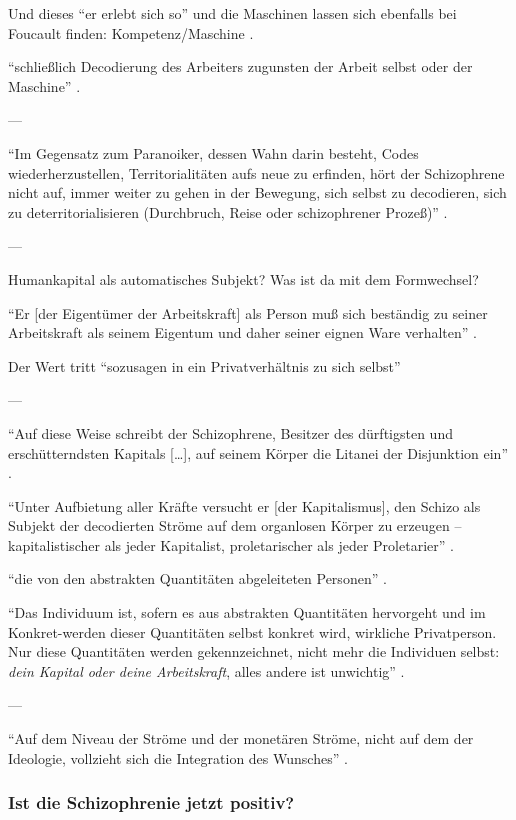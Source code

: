 \documentclass[12pt,
               DIV13,
               paper=a4,
               twoside=false,
               onehalfspacing,
               bibliography=totoc,
               toc=graduated,
               draft,
               ]{scrartcl}
\newcommand{\lips}{\dots\unkern}
\newcommand{\pc}[2]{\parencite[#1]{#2}}
\begin{document}
Und dieses "`er erlebt sich so"' und die Maschinen lassen sich
ebenfalls bei Foucault finden: Kompetenz/Maschine \pc{312+314}{gbp}.

"`schließlich Decodierung des Arbeiters zugunsten der Arbeit selbst
oder der Maschine"' \pc{289}{ao}.

---

"`Im Gegensatz zum Paranoiker, dessen Wahn darin besteht, Codes
wiederherzustellen, Territorialitäten aufs neue zu erfinden, hört der
Schizophrene nicht auf, immer weiter zu gehen in der Bewegung, sich
selbst zu decodieren, sich zu deterritorialisieren (Durchbruch, Reise
oder schizophrener Prozeß)"' \pc{28}{schizg}.

---

Humankapital als automatisches Subjekt? Was ist da mit dem
Formwechsel?

"`Er [der Eigentümer der Arbeitskraft] als Person muß sich beständig
zu seiner Arbeitskraft als seinem Eigentum und daher seiner eignen
Ware verhalten"' \pc{182}{kap}.

Der Wert tritt "`sozusagen in ein Privatverhältnis zu sich selbst"'
\pc{169}{kap}

---

"`Auf diese Weise schreibt der Schizophrene, Besitzer des dürftigsten
und erschütterndsten Kapitals [\lips], auf seinem Körper die Litanei
der Disjunktion ein"' \pc{20}{ao}.

"`Unter Aufbietung aller Kräfte versucht er [der Kapitalismus], den
Schizo als Subjekt der decodierten Ströme auf dem organlosen Körper zu
erzeugen -- kapitalistischer als jeder Kapitalist, proletarischer als
jeder Proletarier"' \pc{S. 44 f.}{ao}.

"`die von den abstrakten Quantitäten abgeleiteten Personen"'
\pc{45}{ao}.

"`Das Individuum ist, sofern es aus abstrakten Quantitäten hervorgeht
und im Konkret-werden dieser Quantitäten selbst konkret wird,
wirkliche \glq Privatperson\grq. Nur diese Quantitäten werden
gekennzeichnet, nicht mehr die Individuen selbst: \emph{dein Kapital
oder deine Arbeitskraft}, alles andere ist unwichtig"' \pc{323}{ao}.

---

"`Auf dem Niveau der Ströme und der monetären Ströme, nicht auf dem
der Ideologie, vollzieht sich die Integration des Wunsches"'
\pc{308}{ao}.

\subsubsection{Ist die Schizophrenie jetzt positiv?}
\end{document}
